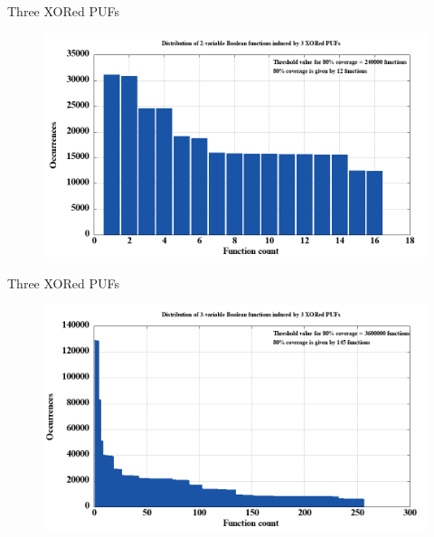 \documentclass[10pt, compress]{beamer}
\begin{document}
\begin{frame}{Three XORed PUFs}
    \begin{figure}
        \centering
        \includegraphics[width=\textwidth]{figures/sorted/distribution_of_2-variable_boolean_functions_induced_by_3_xored_pufs.png}
    \end{figure}
\end{frame}

\begin{frame}{Three XORed PUFs}
    \begin{figure}
        \centering
        \includegraphics[width=\textwidth]{figures/sorted/distribution_of_3-variable_boolean_functions_induced_by_3_xored_pufs.png}
    \end{figure}
\end{frame}
\end{document}
